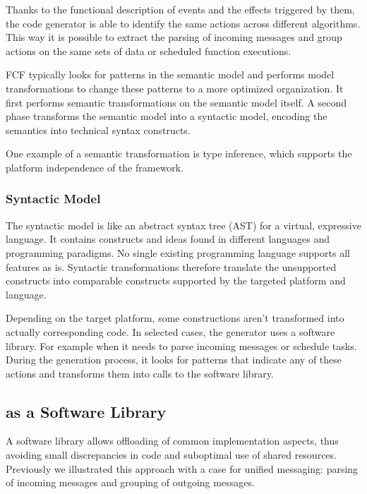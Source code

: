\documentclass[conference]{IEEEtran}
\begin{document}
Thanks to the functional description of events and the effects triggered by
them, the code generator is able to identify the same actions across different
algorithms. This way it is possible to extract the parsing of incoming messages
and group actions on the same sets of data or scheduled function executions.

FCF typically looks for patterns in the semantic model and performs model
transformations to change these patterns to a more optimized organization. It
first performs semantic transformations on the semantic model itself. A second
phase transforms the semantic model into a syntactic model, encoding the
semantics into technical syntax constructs.

One example of a semantic transformation is type inference, which supports the
platform independence of the framework.

\subsubsection{Syntactic Model}

The syntactic model is like an abstract syntax tree (AST) for a virtual,
expressive language. It contains constructs and ideas found in different
languages and programming paradigms. No single existing programming language
supports all features as is. Syntactic transformations therefore translate the
unsupported constructs into comparable constructs supported by the targeted
platform and language.

Depending on the target platform, some constructions aren't transformed into
actually corresponding code. In selected cases, the generator uses a software
library. For example when it needs to parse incoming messages or schedule
tasks. During the generation process, it looks for patterns that indicate any
of these actions and transforms them into calls to the \NAME software library.

\subsection{\NAME as a Software Library}
\label{software-lib-design}

A software library allows offloading of common implementation aspects, thus
avoiding small discrepancies in code and suboptimal use of shared resources.
Previously we illustrated this approach with a case for unified messaging:
parsing of incoming messages and grouping of outgoing messages.
\end{document}
